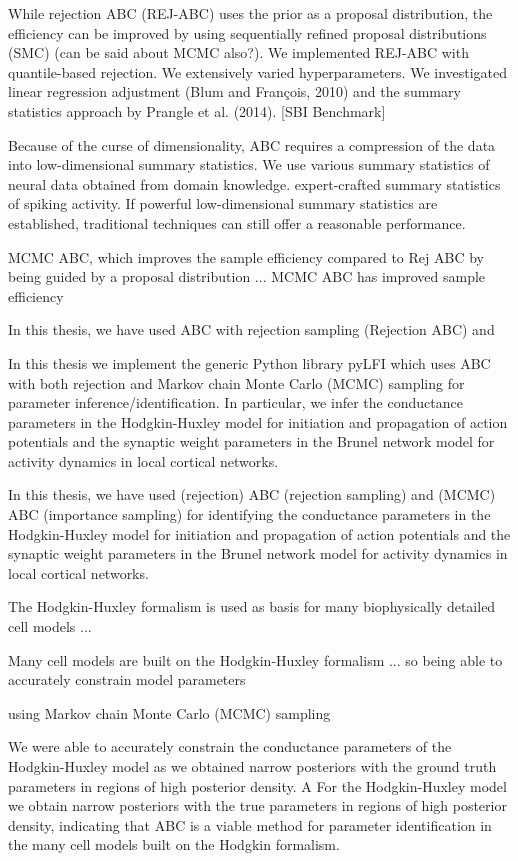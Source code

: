 While rejection ABC (REJ-ABC) uses the prior as a proposal distribution, the efficiency can be improved by using sequentially refined proposal distributions (SMC) (can be said about MCMC also?). We implemented REJ-ABC with quantile-based rejection. 
We extensively varied hyperparameters. We investigated linear regression adjustment (Blum and François, 2010) and the summary statistics approach
by Prangle et al. (2014). [SBI Benchmark]



Because of the curse of dimensionality, ABC requires a compression of the data into low-dimensional summary statistics. We use various summary statistics of neural data obtained from domain knowledge.  expert-crafted summary statistics of spiking activity. If powerful low-dimensional summary statistics are established, traditional techniques can still offer a reasonable performance.

MCMC ABC, which improves the sample efficiency compared to Rej ABC by being guided by a proposal distribution ... MCMC ABC has improved sample efficiency 



In this thesis, we have used ABC with rejection sampling (Rejection ABC) and

In this thesis we implement the generic Python library pyLFI which uses ABC with both rejection and Markov chain Monte Carlo (MCMC) sampling for parameter inference/identification. In particular, we infer the conductance parameters in the Hodgkin-Huxley model for initiation and propagation of action potentials and the synaptic weight parameters in the Brunel network model for activity dynamics in local cortical networks. 

In this thesis, we have used (rejection) ABC (rejection sampling) and (MCMC) ABC (importance sampling) for identifying the conductance parameters in the Hodgkin-Huxley model for initiation and propagation of action potentials and the synaptic weight parameters in the Brunel network model for activity dynamics in local cortical networks. 

The Hodgkin-Huxley formalism is used as basis for many biophysically detailed cell models ...

Many cell models are built on the Hodgkin-Huxley formalism ... so being able to accurately constrain model parameters

using Markov chain Monte Carlo (MCMC) sampling

We were able to accurately constrain the conductance parameters of the Hodgkin-Huxley model as we obtained narrow posteriors with the ground truth parameters in regions of high posterior density. A 
For the Hodgkin-Huxley model we obtain narrow posteriors with the true parameters in regions of high posterior density, indicating that ABC is a viable method for parameter identification in the many cell models built on the Hodgkin formalism. 

